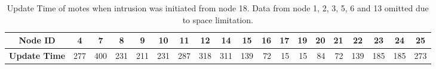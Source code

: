 \documentclass[conference,final]{IEEEtran}
\newcommand*{\bd}[1]{\multicolumn{1}{|c|}{\bfseries #1}}
\begin{document}
\begin{table}[t!]
\centering
\begin{tabular}{|l|*{17}{r|}r|}
\hline
\bd{Node ID}           & \bd{4} & \bd{7} & \bd{8} & \bd{9} & \bd{10} & \bd{11} & \bd{12} & \bd{14} & \bd{15} & \bd{16} & \bd{17} & \bd{19} & \bd{20} & \bd{21} & \bd{22} & \bd{23} & \bd{24} & \bd{25}\\
\hline
\bd{Update Time}  &   277 	&  400 	& 231 	& 211 	& 231 &	 287 	& 318 &	 311 &	 139 & 72 &	 15 &	 15 &	 84 	& 72 	& 139 &	 185 &	185 & 273 \\
\hline
\end{tabular}
\caption{Update Time of motes when intrusion was initiated from node 18. Data from node 1, 2, 3, 5, 6 and 13 omitted due to space limitation.}
\label{tab:tree_time_18}
\end{table}

\end{document}
